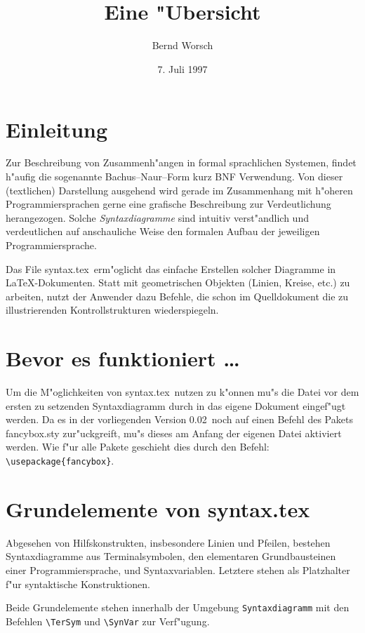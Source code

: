 \documentclass{article}
\title{\syn \\Eine "Ubersicht}
\author{Bernd Worsch}
\date{7. Juli 1997}
\newcommand{\syn}{syntax.tex}
\newcommand{\vers}{0.02}
\begin{document}
\maketitle

\tableofcontents

\section{Einleitung}
Zur Beschreibung von Zusammenh"angen in formal sprachlichen Systemen, 
findet h"aufig die sogenannte Bachus--Naur--Form kurz BNF Verwendung.
Von dieser (textlichen) Darstellung ausgehend wird gerade im Zusammenhang
mit h"oheren Programmiersprachen gerne eine grafische Beschreibung zur
Verdeutlichung herangezogen.
Solche \emph{Syntaxdiagramme} sind intuitiv verst"andlich und verdeutlichen
auf anschauliche Weise den formalen Aufbau der jeweiligen Programmiersprache.

Das File \syn\ erm"oglicht das einfache Erstellen solcher Diagramme in
\LaTeX -Dokumenten.
Statt mit geometrischen Objekten (Linien, Kreise, etc.) zu arbeiten, 
nutzt der Anwender dazu Befehle, die schon im Quelldokument die zu 
illustrierenden Kontrollstrukturen wiederspiegeln.  
 
\section{Bevor es funktioniert \dots}
Um die M"oglichkeiten von \syn\ nutzen zu k"onnen mu"s die Datei vor dem
ersten zu setzenden Syntaxdiagramm durch 
\verb++
in das eigene Dokument eingef"ugt werden. Da es in der vorliegenden
Version \vers\ noch auf einen Befehl des Pakets fancybox.sty 
zur"uckgreift, mu"s dieses am Anfang der eigenen Datei aktiviert werden.
Wie f"ur alle Pakete geschieht dies durch den Befehl: 
\verb+\usepackage{fancybox}+.

\section{Grundelemente von \syn}
Abgesehen von Hilfskonstrukten, insbesondere Linien und Pfeilen, 
bestehen Syntaxdiagramme aus Terminalsymbolen, den elementaren
Grundbausteinen einer Programmiersprache, und Syntaxvariablen.
Letztere stehen als Platzhalter f"ur syntaktische Konstruktionen. 

Beide Grundelemente stehen innerhalb der Umgebung \verb+Syntaxdiagramm+
mit den Befehlen \verb+\TerSym+ und \verb+\SynVar+ zur Verf"ugung.
\end{document}
